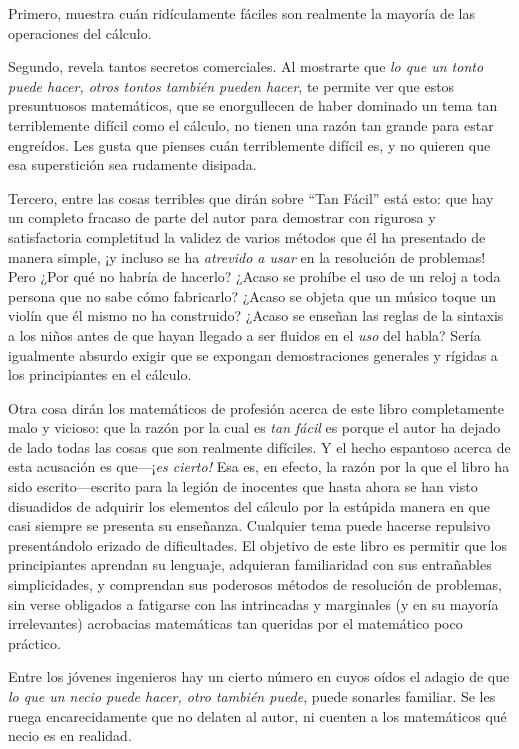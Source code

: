 \documentclass[12pt]{book}[2005/09/16]
\newcommand{\DPPageSep}[2]{\Pagelabel{#2}}
\newcommand{\Pagelabel}[1]
  {\phantomsection\label{#1}}
\begin{document}
Primero, muestra cuán ridículamente fáciles son realmente la mayoría de las
operaciones del cálculo.

Segundo, revela tantos secretos comerciales. Al
mostrarte que \emph{lo que un tonto puede hacer, otros tontos
también pueden hacer}, te permite ver que estos presuntuosos matemáticos, que se enorgullecen de haber dominado un
tema tan terriblemente difícil como el cálculo, no tienen
una razón tan grande para estar engreídos. Les gusta que pienses
cuán terriblemente difícil es, y no quieren que esa
superstición sea rudamente disipada.

Tercero, entre las cosas terribles que dirán
sobre ``Tan Fácil'' está esto: que hay un completo fracaso
de parte del autor para demostrar con rigurosa
\DPPageSep{262.png}{250}%
y satisfactoria completitud la validez de varios
métodos que él ha presentado de manera simple,
¡y incluso se ha \emph{atrevido a usar} en la resolución de problemas! Pero
¿Por qué no habría de hacerlo? ¿Acaso se prohíbe el uso de
un reloj a toda persona que no sabe cómo fabricarlo? ¿Acaso se
objeta que un músico toque un violín que él mismo no ha construido?
¿Acaso se enseñan las reglas de la sintaxis a los niños antes
de que hayan llegado a ser fluidos en el \emph{uso} del habla?
Sería igualmente absurdo exigir que se expongan demostraciones
generales y rígidas a los principiantes en el cálculo.

Otra cosa dirán los matemáticos de profesión acerca de este
libro completamente malo y vicioso: que la razón por la cual es
\emph{tan fácil} es porque el autor ha dejado de lado todas las cosas
que son realmente difíciles. Y el hecho espantoso acerca de
esta acusación es que—¡\emph{es cierto!} Esa es, en efecto, la razón
por la que el libro ha sido escrito—escrito para la legión de
inocentes que hasta ahora se han visto disuadidos de adquirir
los elementos del cálculo por la estúpida manera en que casi
siempre se presenta su enseñanza. Cualquier tema puede
hacerse repulsivo presentándolo erizado de dificultades. El
objetivo de este libro es permitir que los principiantes aprendan
su lenguaje, adquieran familiaridad con sus entrañables
simplicidades, y comprendan sus poderosos métodos de
resolución de problemas, sin verse obligados a fatigarse con
las intrincadas y marginales (y en su mayoría irrelevantes)
acrobacias matemáticas tan queridas por el matemático poco
práctico.
\DPPageSep{263.png}{251}%

Entre los jóvenes ingenieros hay un cierto número en cuyos
oídos el adagio de que \emph{lo que un necio puede hacer,
otro también puede}, puede sonarles familiar. Se les ruega
encarecidamente que no delaten al autor, ni cuenten a los
matemáticos qué necio es en realidad.
\DPPageSep{264.png}{252}%
\end{document}
